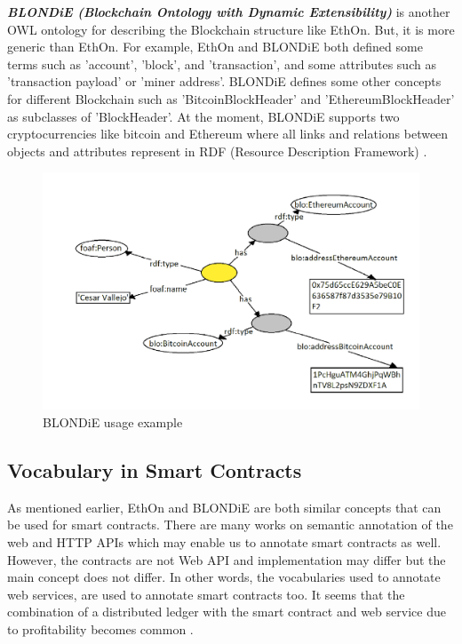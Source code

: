 \begin{center}
\begin{figure}[htb!]
		
	\end{figure}
	
\end{center}
\textbf{\textit{BLONDiE (Blockchain Ontology with Dynamic Extensibility)}} is another OWL ontology for describing the Blockchain structure like EthOn. But, it is more generic than EthOn. For example, EthOn and BLONDiE both defined some terms such as 'account', 'block', and 'transaction', and some attributes such as 'transaction payload' or 'miner address'. BLONDiE defines some other concepts for different Blockchain such as 'BitcoinBlockHeader' and 'EthereumBlockHeader' as subclasses of 'BlockHeader'. At the moment, BLONDiE supports two cryptocurrencies like bitcoin and Ethereum where all links and relations between objects and attributes represent in RDF (Resource Description Framework) \cite{Third}.
\begin{center}
	\begin{figure}[htb!]
		
		\begin{minipage}{0.55\linewidth}
			\centering
			\includegraphics[width=1.75\textwidth]{images/chap02_BLONDiE.png}
		\end{minipage}
		\caption[BLONDiE]{BLONDiE usage example \cite{Hector}}
		
		
	\end{figure}
	
\end{center}
\subsection{Vocabulary in Smart Contracts}
As mentioned earlier, EthOn and BLONDiE are both similar concepts that can be used for smart contracts. There are many works on semantic annotation of the web and HTTP APIs which may enable us to annotate smart contracts as well. However, the contracts are not Web API and implementation may differ but the main concept does not differ. In other words, the vocabularies used to annotate web services, are used to annotate smart contracts too. It seems that the combination of a distributed ledger with the smart contract and web service due to profitability becomes common \cite{Third}.

